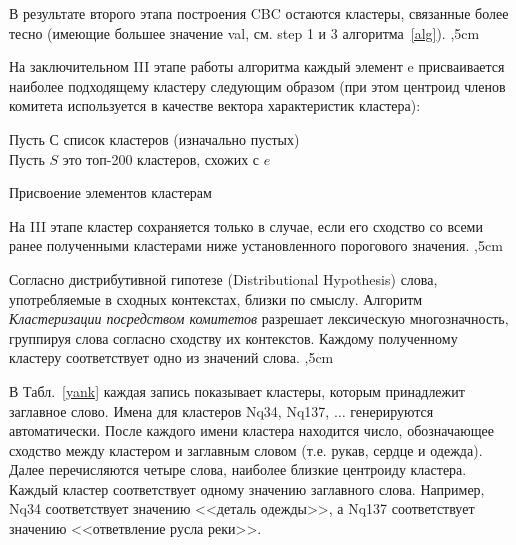 \documentclass{article}
\begin{document}
\begin{articletext}
В результате второго этапа построения CBC остаются кластеры, связанные более тесно (имеющие большее значение val, см. step 1 и 3 алгоритма~\ref{alg}).
,5cm

На заключительном III этапе работы алгоритма каждый элемент e присваивается наиболее подходящему кластеру следующим образом (при этом центроид членов комитета используется в качестве вектора характеристик кластера):

\bfullwidth
\begin{algorithm}[H]
\SetAlgoLined

Пусть $С$ список кластеров (изначально пустых)\\
Пусть $S$ это топ-200 кластеров, схожих с $e$\\
\caption{Присвоение элементов кластерам}
\label{alg1}
\end{algorithm}
\efullwidth

На III этапе кластер сохраняется только в случае, если его сходство со всеми ранее полученными кластерами ниже установленного порогового значения.
,5cm

Согласно дистрибутивной гипотезе (Distributional Hypothesis) \cite{Harris 1985} слова, употребляемые в сходных контекстах, близки по смыслу. Алгоритм \textit{Кластеризации посредством комитетов} \cite{Pantel 2002} разрешает лексическую многозначность, группируя слова согласно сходству их контекстов. Каждому полученному кластеру соответствует одно из значений слова.
,5cm

В Табл.~\ref{yank} каждая запись показывает кластеры, которым принадлежит заглавное слово. Имена для кластеров Nq34, Nq137, $\ldots$ генерируются автоматически. После каждого имени кластера находится число, обозначающее сходство между кластером и заглавным словом (т.е. рукав, сердце и одежда). Далее перечисляются четыре слова, наиболее близкие центроиду кластера. Каждый кластер соответствует одному значению заглавного слова. Например, Nq34 соответствует значению <<деталь одежды>>, а Nq137 соответствует значению <<ответвление русла реки>>.


\end{articletext}
\end{document}
